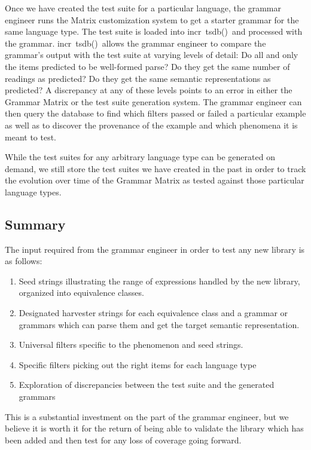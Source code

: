\documentclass[11pt]{article}
\newcommand{\itsdb}{\mbox{\sf \lbrack incr tsdb()\rbrack}}
\begin{document}
Once we have created the test suite for a particular language, the
grammar engineer runs the Matrix customization system to get a starter
grammar for the same language type.  The test suite is loaded into
\itsdb\ and processed with the grammar.  \itsdb\ allows the grammar
engineer to compare the grammar's output with the test suite at
varying levels of detail: Do all and only the items predicted to be
well-formed parse?  Do they get the same number of readings as
predicted?  Do they get the same semantic representations as
predicted?  A discrepancy at any of these levels points to an error in
either the Grammar Matrix or the test suite generation system.  The
grammar engineer can then query the database to find which filters
passed or failed a particular example as well as to discover the
provenance of the example and which phenomena it is meant to test.

While the test suites for any arbitrary language type can be
generated on demand, we still store the test suites we have created
in the past in order to track the evolution over time of the Grammar
Matrix as tested against those particular language types.

\subsection{Summary}

The input required from the grammar engineer in order to
test any new library is as follows:

\begin{enumerate}
\item Seed strings illustrating the range of expressions
handled by the new library, organized into equivalence
classes.
\item Designated harvester strings for each equivalence class
and a grammar or grammars which can parse them and get
the target semantic representation.
\item Universal filters specific to the phenomenon and
seed strings.
\item Specific filters picking out the right items for
each language type
\item Exploration of discrepancies between the test suite
and the generated grammars
\end{enumerate}
%
This is a substantial investment on the part of the grammar
engineer, but we believe it is worth it for the return of
being able to validate the library which has been added and
then test for any loss of coverage going forward.
\end{document}
